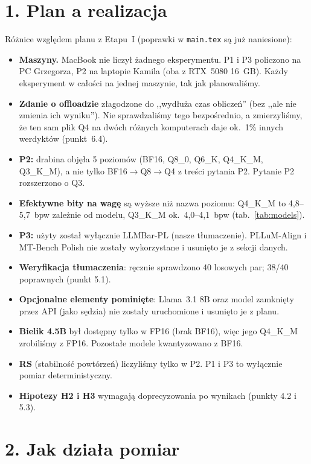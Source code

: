\documentclass[10pt,a4paper]{article}
\begin{document}
\section*{1. Plan a realizacja}
Różnice względem planu z Etapu~I (poprawki w \texttt{main.tex} są już naniesione):
\begin{itemize}
  \item \textbf{Maszyny.} MacBook nie liczył żadnego eksperymentu. P1 i P3 policzono na PC Grzegorza, P2 na laptopie Kamila (oba z RTX~5080 16~GB). Każdy eksperyment w całości na jednej maszynie, tak jak planowaliśmy.
  \item \textbf{Zdanie o offloadzie} złagodzone do ,,wydłuża czas obliczeń'' (bez ,,ale nie zmienia ich wyniku''). Nie sprawdzaliśmy tego bezpośrednio, a zmierzyliśmy, że ten sam plik Q4 na dwóch różnych komputerach daje ok.~1\% innych werdyktów (punkt~6.4).
  \item \textbf{P2:} drabina objęła 5 poziomów (BF16, Q8\_0, Q6\_K, Q4\_K\_M, Q3\_K\_M), a nie tylko BF16$\rightarrow$Q8$\rightarrow$Q4 z treści pytania P2. Pytanie P2 rozszerzono o Q3.
  \item \textbf{Efektywne bity na wagę} są wyższe niż nazwa poziomu: Q4\_K\_M to 4,8--5,7~bpw zależnie od modelu, Q3\_K\_M ok.~4,0--4,1~bpw (tab.~\ref{tab:models}).
  \item \textbf{P3:} użyty został wyłącznie LLMBar-PL (nasze tłumaczenie). PLLuM-Align i MT-Bench Polish nie zostały wykorzystane i usunięto je z sekcji danych.
  \item \textbf{Weryfikacja tłumaczenia}: ręcznie sprawdzono 40 losowych par; 38/40 poprawnych (punkt 5.1).
  \item \textbf{Opcjonalne elementy pominięte}: Llama~3.1 8B oraz model zamknięty przez API (jako sędzia) nie zostały uruchomione i usunięto je z planu.
  \item \textbf{Bielik 4.5B} był dostępny tylko w FP16 (brak BF16), więc jego Q4\_K\_M zrobiliśmy z FP16. Pozostałe modele kwantyzowano z BF16.
  \item \textbf{RS} (stabilność powtórzeń) liczyliśmy tylko w P2. P1 i P3 to wyłącznie pomiar deterministyczny.
  \item \textbf{Hipotezy H2 i H3} wymagają doprecyzowania po wynikach (punkty 4.2 i 5.3).
\end{itemize}

\section*{2. Jak działa pomiar}
\end{document}
